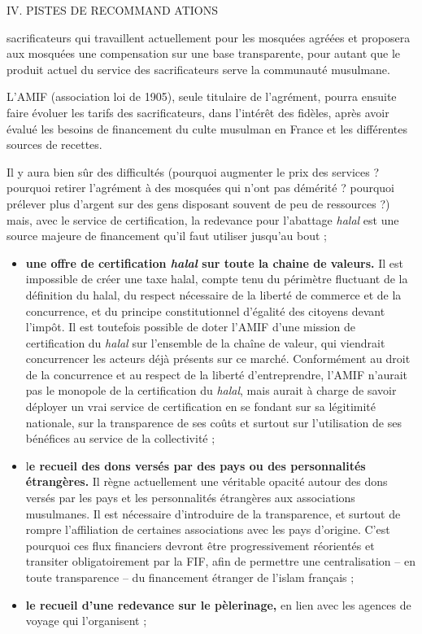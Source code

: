 IV. PISTES DE RECOMMAND ATIONS

sacrificateurs qui travaillent actuellement pour les mosquées agréées et
proposera aux mosquées une compensation sur une base transparente, pour
autant que le produit actuel du service des sacrificateurs serve la
communauté musulmane.

L'AMIF (association loi de 1905), seule titulaire de l'agrément, pourra
ensuite faire évoluer les tarifs des sacrificateurs, dans l'intérêt des
fidèles, après avoir évalué les besoins de financement du culte musulman
en France et les différentes sources de recettes.

Il y aura bien sûr des difficultés (pourquoi augmenter le prix des
services ? pourquoi retirer l'agrément à des mosquées qui n'ont pas
démérité ? pourquoi prélever plus d'argent sur des gens disposant
souvent de peu de ressources ?) mais, avec le service de certification,
la redevance pour l'abattage \emph{halal} est une source majeure de
financement qu'il faut utiliser jusqu'au bout ;


\begin{itemize}
\item
  \textbf{une offre de certification \emph{halal} sur toute la chaine de
  valeurs.} Il est impossible de créer une taxe halal, compte tenu du
  périmètre fluctuant de la définition du halal, du respect nécessaire
  de la liberté de commerce et de la concurrence, et du principe
  constitutionnel d'égalité des citoyens devant l'impôt. Il est
  toutefois possible de doter l'AMIF d'une mission de certification du
  \emph{halal} sur l'ensemble de la chaîne de valeur, qui viendrait
  concurrencer les acteurs déjà présents sur ce marché. Conformément au
  droit de la concurrence et au respect de la liberté d'entreprendre,
  l'AMIF n'aurait pas le monopole de la certification du \emph{halal},
  mais aurait à charge de savoir déployer un vrai service de
  certification en se fondant sur sa légitimité nationale, sur la
  transparence de ses coûts et surtout sur l'utilisation de ses
  bénéfices au service de la collectivité ;
\item
  l\textbf{e recueil des dons versés par des pays ou des personnalités
  étrangères.} Il règne actuellement une véritable opacité autour des
  dons versés par les pays et les personnalités étrangères aux
  associations musulmanes. Il est nécessaire d'introduire de la
  transparence, et surtout de rompre l'affiliation de certaines
  associations avec les pays d'origine. C'est pourquoi ces flux
  financiers devront être progressivement réorientés et transiter
  obligatoirement par la FIF, afin de permettre une centralisation -- en
  toute transparence -- du financement étranger de l'islam français ;
\item
  \textbf{le recueil d'une redevance sur le pèlerinage,} en lien avec
  les agences de voyage qui l'organisent ;
\end{itemize}





